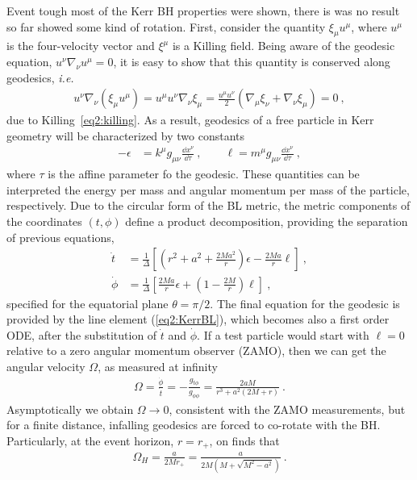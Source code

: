 Event tough most of the Kerr BH properties were shown, there is was no result so far showed some kind of rotation.
First, consider the quantity $\xi_\mu u^\mu$, where $u^\mu$ is the four-velocity vector and $\xi^\mu$ is a Killing field.
Being aware of the geodesic equation, $u^\nu \nabla_\nu u^\mu = 0$, it is easy to show that this quantity is conserved along geodesics, \emph{i.e.}
\begin{align}
    u^\nu \nabla_\nu ( \xi_\mu u^\mu ) = u^\mu u^\nu \nabla_\nu \xi_\mu = \frac{u^\mu u^\nu }{2} ( \nabla_\mu \xi_\nu + \nabla_\nu \xi_\mu ) = 0 ~,
    \label{eq2:geodesicKilling}
\end{align}
due to Killing~\eqref{eq2:killing}.
As a result, geodesics of a free particle in Kerr geometry will be characterized by two constants
\begin{align}
    -\epsilon &= k^\mu g_{\mu\nu} \frac{\dd x^\nu}{\dd \tau} ~, \qquad \ell = m^\mu g_{\mu\nu} \frac{\dd x^\nu}{\dd \tau} ~,
    \label{eq2:geodesicConsts}
\end{align}
where $\tau$ is the affine parameter fo the geodesic.
These quantities can be interpreted the energy per mass and angular momentum per mass of the particle, respectively.
Due to the circular form of the BL metric, the metric components of the coordinates $(t,\phi)$ define a product decomposition, providing the separation of previous equations, 
\begin{align}
    \dot{t} &= \frac{1}{\Delta} \left[ (r^2+a^2 +\frac{2 M a^2}{r})\epsilon - \frac{2 M a}{r} \ell \right] ~, \\
    \dot{\phi} &= \frac{1}{\Delta} \left[ \frac{2 M a}{r} \epsilon +\left( 1- \frac{2 M}{r} \right) \ell \right]  ~,
    \label{eq2:geodesicPhiT}
\end{align}
specified for the equatorial plane $\theta=\pi/2$. The final equation for the geodesic is provided by the line element (\ref{eq2:KerrBL}), which becomes also a first order ODE, after the substitution of $\dot{t}$ and $\dot{\phi}$. If a test particle would start with $\ell=0$ relative to a zero angular momentum observer (ZAMO), then we can get the angular velocity $\Omega$, as measured at infinity
 \begin{align}
    \Omega = \frac{\dot{\phi}}{\dot{t}} = - \frac{g_{t\phi}}{g_{\phi\phi}} = \frac{2 a M}{r^3 + a^2 (2 M+r)} ~.
    \label{eq2:geodesicKilling}
\end{align}
Asymptotically we obtain $\Omega\to0$, consistent with the ZAMO measurements, but for a finite distance, infalling geodesics are forced to co-rotate with the BH. 
Particularly, at the event horizon, $r=r_+$, on finds that
 \begin{align}
    \Omega_H = \frac{a}{2 M r_+} = \frac{a}{2 M (M+\sqrt{M^2-a^2})} ~.
    \label{eq2:geodesicKilling}
\end{align}


